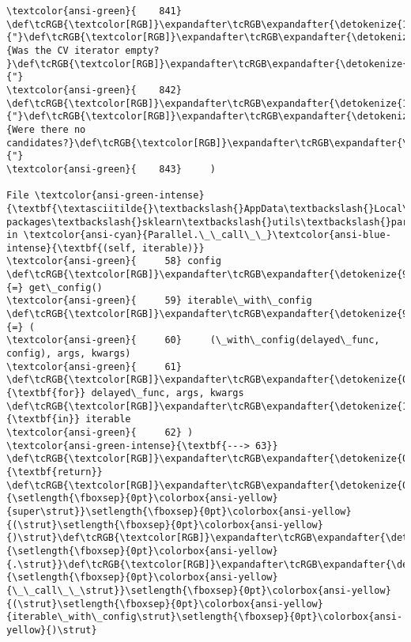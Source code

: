 \documentclass[11pt]{article}
\begin{document}
\begin{Verbatim}[commandchars=\\\{\}, frame=single, framerule=2mm, rulecolor=\color{outerrorbackground}]
\textcolor{ansi-green}{    841}         \def\tcRGB{\textcolor[RGB]}\expandafter\tcRGB\expandafter{\detokenize{175,0,0}}{"}\def\tcRGB{\textcolor[RGB]}\expandafter\tcRGB\expandafter{\detokenize{175,0,0}}{Was the CV iterator empty? }\def\tcRGB{\textcolor[RGB]}\expandafter\tcRGB\expandafter{\detokenize{175,0,0}}{"}
\textcolor{ansi-green}{    842}         \def\tcRGB{\textcolor[RGB]}\expandafter\tcRGB\expandafter{\detokenize{175,0,0}}{"}\def\tcRGB{\textcolor[RGB]}\expandafter\tcRGB\expandafter{\detokenize{175,0,0}}{Were there no candidates?}\def\tcRGB{\textcolor[RGB]}\expandafter\tcRGB\expandafter{\detokenize{175,0,0}}{"}
\textcolor{ansi-green}{    843}     )

File \textcolor{ansi-green-intense}{\textbf{\textasciitilde{}\textbackslash{}AppData\textbackslash{}Local\textbackslash{}anaconda3\textbackslash{}lib\textbackslash{}site-packages\textbackslash{}sklearn\textbackslash{}utils\textbackslash{}parallel.py:63}}, in \textcolor{ansi-cyan}{Parallel.\_\_call\_\_}\textcolor{ansi-blue-intense}{\textbf{(self, iterable)}}
\textcolor{ansi-green}{     58} config \def\tcRGB{\textcolor[RGB]}\expandafter\tcRGB\expandafter{\detokenize{98,98,98}}{=} get\_config()
\textcolor{ansi-green}{     59} iterable\_with\_config \def\tcRGB{\textcolor[RGB]}\expandafter\tcRGB\expandafter{\detokenize{98,98,98}}{=} (
\textcolor{ansi-green}{     60}     (\_with\_config(delayed\_func, config), args, kwargs)
\textcolor{ansi-green}{     61}     \def\tcRGB{\textcolor[RGB]}\expandafter\tcRGB\expandafter{\detokenize{0,135,0}}{\textbf{for}} delayed\_func, args, kwargs \def\tcRGB{\textcolor[RGB]}\expandafter\tcRGB\expandafter{\detokenize{175,0,255}}{\textbf{in}} iterable
\textcolor{ansi-green}{     62} )
\textcolor{ansi-green-intense}{\textbf{---> 63}} \def\tcRGB{\textcolor[RGB]}\expandafter\tcRGB\expandafter{\detokenize{0,135,0}}{\textbf{return}} \def\tcRGB{\textcolor[RGB]}\expandafter\tcRGB\expandafter{\detokenize{0,135,0}}{\setlength{\fboxsep}{0pt}\colorbox{ansi-yellow}{super\strut}}\setlength{\fboxsep}{0pt}\colorbox{ansi-yellow}{(\strut}\setlength{\fboxsep}{0pt}\colorbox{ansi-yellow}{)\strut}\def\tcRGB{\textcolor[RGB]}\expandafter\tcRGB\expandafter{\detokenize{98,98,98}}{\setlength{\fboxsep}{0pt}\colorbox{ansi-yellow}{.\strut}}\def\tcRGB{\textcolor[RGB]}\expandafter\tcRGB\expandafter{\detokenize{0,0,255}}{\setlength{\fboxsep}{0pt}\colorbox{ansi-yellow}{\_\_call\_\_\strut}}\setlength{\fboxsep}{0pt}\colorbox{ansi-yellow}{(\strut}\setlength{\fboxsep}{0pt}\colorbox{ansi-yellow}{iterable\_with\_config\strut}\setlength{\fboxsep}{0pt}\colorbox{ansi-yellow}{)\strut}


\end{Verbatim}
\end{document}
